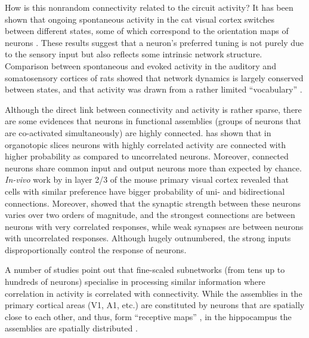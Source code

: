     How is this nonrandom connectivity related to the circuit activity? It has
    been shown that ongoing spontaneous activity in the cat visual cortex
    switches between different states, some of which correspond to the
    orientation maps of neurons \citep{Kenet2003}. These results suggest that
    a neuron's preferred tuning is not purely due to the sensory input but also
    reflects some intrinsic network structure. Comparison between spontaneous
    and evoked activity in the auditory and somatosensory cortices of rats
    showed that network dynamics is largely conserved between states, and that
    activity was drawn from a rather limited ``vocabulary'' \citep{Luczak2009,
    Luczak2012}.
    
    Although the direct link between connectivity and activity is rather
    sparse, there are some evidences that neurons in functional assemblies
    (groups of neurons that are co-activated simultaneously) are highly
    connected. \cite{Takahashi2010} has shown that in organotopic slices
    neurons with highly correlated activity are connected with higher
    probability as compared to uncorrelated neurons. Moreover, connected neurons share
    common input and output neurons more than expected by chance. {\it In-vivo}
    work by \cite{Ko2011} in layer 2/3 of the mouse primary visual cortex
    revealed that cells with similar preference have bigger probability of
    uni- and bidirectional connections. Moreover, \cite{Cossell2015} showed
    that the synaptic strength between these neurons varies over two orders of
    magnitude, and the strongest connections are between neurons with very
    correlated responses, while weak synapses are between neurons with
    uncorrelated responses. Although hugely outnumbered, the strong inputs
    disproportionally control the response of neurons. 

    A number of studies point out that fine-scaled subnetworks (from tens up
    to hundreds of neurons) specialise in processing similar information where
    correlation in activity is correlated with connectivity. While the
    assemblies in the primary cortical areas (V1, A1, etc.) are constituted by
    neurons that are spatially close to each other, and thus, form ``receptive
    maps'' \cite[e.g.,][]{Bathellier2012, Cossell2015}, in the hippocampus the
    assemblies are spatially distributed \citep{Guzman2016}.

